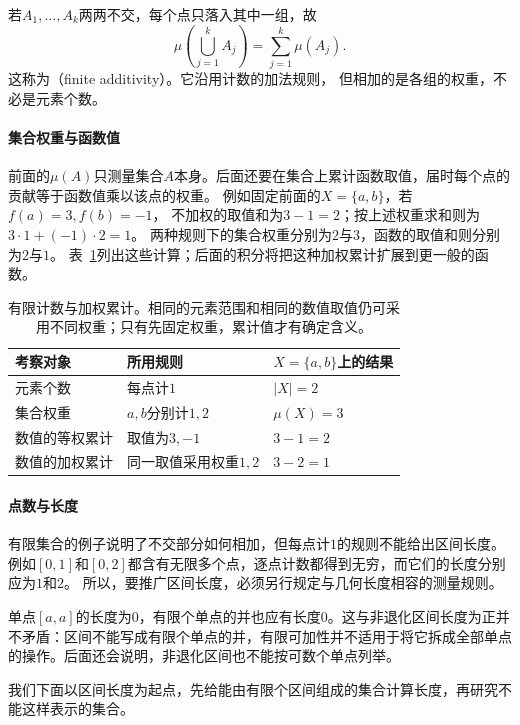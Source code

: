 若$A_1,\ldots,A_k$两两不交，每个点只落入其中一组，故
\[
 \mu\left(\bigcup_{j=1}^k A_j\right)=\sum_{j=1}^k\mu(A_j).
\]
这称为（finite additivity）。它沿用计数的加法规则，
但相加的是各组的权重，不必是元素个数。

\paragraph{集合权重与函数值}

前面的$\mu(A)$只测量集合$A$本身。后面还要在集合上累计函数取值，届时每个点的贡献等于函数值乘以该点的权重。
例如固定前面的$X=\{a,b\}$，若$f(a)=3,f(b)=-1$，
不加权的取值和为$3-1=2$；按上述权重求和则为$3\cdot1+(-1)\cdot2=1$。
两种规则下的集合权重分别为$2$与$3$，函数的取值和则分别为$2$与$1$。
表~\ref{tab:analysis-metric-measure-integral}列出这些计算；后面的积分将把这种加权累计扩展到更一般的函数。
\begin{table}[htbp]
 \centering\small
 \begin{tabularx}{\linewidth}{@{}lXX@{}}
 \toprule
 考察对象 & 所用规则 & $X=\{a,b\}$上的结果\\
 \midrule
 元素个数 & 每点计$1$ & $|X|=2$\\
 集合权重 & $a,b$分别计$1,2$ & $\mu(X)=3$\\
 数值的等权累计 & 取值为$3,-1$ & $3-1=2$\\
 数值的加权累计 & 同一取值采用权重$1,2$ & $3-2=1$\\
 \bottomrule
 \end{tabularx}
 \caption{有限计数与加权累计。相同的元素范围和相同的数值取值仍可采用不同权重；只有先固定权重，累计值才有确定含义。}
 \label{tab:analysis-metric-measure-integral}
\end{table}

\paragraph{点数与长度}

有限集合的例子说明了不交部分如何相加，但每点计$1$的规则不能给出区间长度。
例如$[0,1]$和$[0,2]$都含有无限多个点，逐点计数都得到无穷，而它们的长度分别应为$1$和$2$。
所以，要推广区间长度，必须另行规定与几何长度相容的测量规则。

单点$[a,a]$的长度为$0$，有限个单点的并也应有长度$0$。这与非退化区间长度为正并不矛盾：区间不能写成有限个单点的并，有限可加性并不适用于将它拆成全部单点的操作。后面还会说明，非退化区间也不能按可数个单点列举。

我们下面以区间长度为起点，先给能由有限个区间组成的集合计算长度，再研究不能这样表示的集合。

